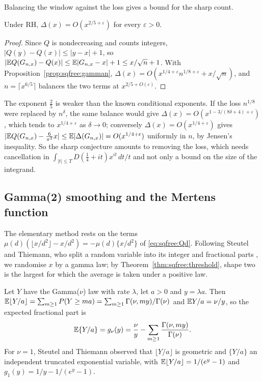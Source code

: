 Balancing the window against the loss gives a bound for the sharp count.

\begin{corollary}\label{cor:sqfree:twofifths}
Under RH, $\Delta(x)=O(x^{2/5+\varepsilon})$ for every $\varepsilon>0$.
\end{corollary}

\begin{proof}
Since $Q$ is nondecreasing and counts integers, $|Q(y)-Q(x)|\le|y-x|+1$, so $|\mathbb{E} Q(G_{n,x})-Q(x)|\le\mathbb{E}|G_{n,x}-x|+1\le x/\sqrt n+1$. With Proposition~\ref{prop:sqfree:gamman}, $\Delta(x)=O(x^{1/4+\varepsilon}n^{1/8+\varepsilon}+x/\sqrt n)$, and $n=\lceil x^{6/5}\rceil$ balances the two terms at $x^{2/5+O(\varepsilon)}$.
\end{proof}

The exponent $\frac25$ is weaker than the known conditional exponents. If the loss $n^{1/8}$ were replaced by $n^\delta$, the same balance would give $\Delta(x)=O(x^{1-3/(8\delta+4)+\varepsilon})$, which tends to $x^{1/4+\varepsilon}$ as $\delta\to0$; conversely $\Delta(x)=O(x^{1/4+\varepsilon})$ gives $|\mathbb{E} Q(G_{n,x})-\frac6{\pi^2}x|\le\mathbb{E}|\Delta(G_{n,x})|=O(x^{1/4+\varepsilon})$ uniformly in $n$, by Jensen's inequality. So the sharp conjecture amounts to removing the loss, which needs cancellation in $\int_{|t|\le T}D(\frac14+it)x^{it}\,dt/t$ and not only a bound on the size of the integrand.

\subsection{Gamma(2) smoothing and the Mertens function}\label{sec:sqfree:mertens}

The elementary method rests on the terms $\mu(d)(\lfloor x/d^2\rfloor-x/d^2)=-\mu(d)\{x/d^2\}$ of \eqref{eq:sqfree:Qd}. Following Steutel and Thiemann, who split a random variable into its integer and fractional parts \cite{SteutelThiemann89}, we randomise $x$ by a gamma law; by Theorem~\ref{thm:sqfree:threshold}, shape two is the largest for which the average is taken under a positive law.

Let $Y$ have the Gamma($\nu$) law with rate $\lambda$, let $a>0$ and $y=\lambda a$. Then $\mathbb{E}\lfloor Y/a\rfloor=\sum_{m\ge1}P(Y\ge ma)=\sum_{m\ge1}\Gamma(\nu,my)/\Gamma(\nu)$ and $\mathbb{E} Y/a=\nu/y$, so the expected fractional part is
\[
\mathbb{E}\{Y/a\}=g_\nu(y)=\frac\nu y-\sum_{m\ge1}\frac{\Gamma(\nu,my)}{\Gamma(\nu)} .
\]
For $\nu=1$, Steutel and Thiemann observed that $\lfloor Y/a\rfloor$ is geometric and $\{Y/a\}$ an independent truncated exponential variable, with $\mathbb{E}\lfloor Y/a\rfloor=1/(e^y-1)$ and $g_1(y)=1/y-1/(e^y-1)$.

